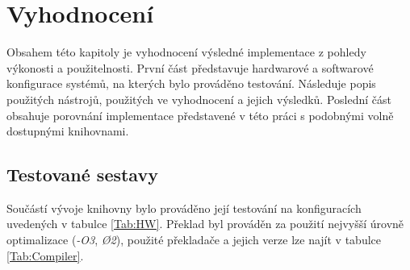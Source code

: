 




\chapter{Vyhodnocení}
\label{Chap:Results}

Obsahem této kapitoly je vyhodnocení výsledné implementace z pohledy výkonosti a použitelnosti. První část představuje hardwarové a softwarové konfigurace systémů, na kterých bylo prováděno testování. Následuje popis použitých nástrojů, použitých ve vyhodnocení a jejich výsledků. Poslední část obsahuje porovnání implementace představené v této práci s podobnými volně dostupnými knihovnami.

\section{Testované sestavy}

Součástí vývoje knihovny bylo prováděno její testování na konfiguracích uvedených v tabulce \ref{Tab:HW}. Překlad byl prováděn za použití nejvyšší úrovně optimalizace (\emph{-O3}, \emph{\O2}), použité překladače a jejich verze lze najít v tabulce \ref{Tab:Compiler}. 

